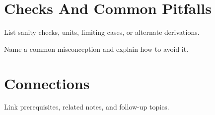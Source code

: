 \documentclass[11pt]{article}
\begin{document}
\section{Checks And Common Pitfalls}

\begin{checkpointbox}
List sanity checks, units, limiting cases, or alternate derivations.
\end{checkpointbox}

\begin{warningbox}
Name a common misconception and explain how to avoid it.
\end{warningbox}

\section{Connections}

Link prerequisites, related notes, and follow-up topics.
\end{document}
